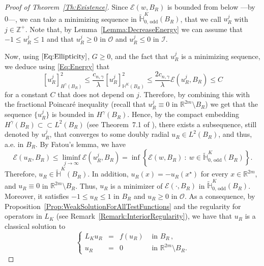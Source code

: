 \documentclass[12pt,reqno]{amsart}
\theoremstyle{definition}
\theoremstyle{remark}
\newcommand{\con}[1]{\mathbb{#1}}
\newcommand{\R}{\con{R}} %
\newcommand{\Z}{\con{Z}} %
\renewcommand{\H}{\con{H}}
\newcommand{\ecal}{\mathcal{E}}
\newcommand{\ical}{\mathcal{I}}
\newcommand{\ocal}{\mathcal{O}}
\newcommand{\s}{\gamma}
\newcommand{\setcond}[2]{\left \{ #1 \ : \ #2  \right \}}
\newcommand\beqc[1]{\left\{\begin{array}{#1}}
\newcommand\eeqc{\end{array} \right.}
\def\PDEsystem{rcll}
\numberwithin{equation}{section}
\begin{document}
\begin{proof}[Proof of Theorem~\ref{Th:Existence}]
	Since $\ecal(w,B_R)$ is bounded from below ---by $0$---, we can take a minimizing sequence in $\widetilde{\H}^K_{0, \,\mathrm{odd}}(B_R)$, that we call $u_R^j$ with $j\in \Z^+$. Note that, by Lemma~\ref{Lemma:DecreaseEnergy} we can assume that $-1 \leq u_R^j \leq 1$ and that $u_R^j \geq 0$ in $\ocal$ and  $u_R^j \leq 0$ in $\ical$. 
	
	Now, using $\eqref{Eq:Ellipticity}$, $G\geq 0$, and the fact that $u_R^j$ is a minimizing sequence, we deduce using \eqref{Eq:Energy} that 
	$$
	[u_R^j]^2_{H^\s(B_R)} \leq \dfrac{c_{n,\s}}{\lambda}  [u_R^j]^2_{\H^K(B_R)}\leq \dfrac{2 c_{n,\s}}{\lambda}\ecal(u_R^j,B_R) \leq C
	$$
	for a constant $C$ that does not depend on $j$. Therefore, by combining this with the fractional Poincaré inequality (recall that $u_R^j \equiv 0$ in $\R^{2m}\setminus B_R$) we get that the sequence $\{u_R^j\}$ is bounded in $H^\s(B_R)$. Hence, by the compact embedding $H^\s(B_R) \subset \subset L^2(B_R)$ (see Theorem~7.1 of \cite{HitchhikerGuide}), there exists a subsequence, still denoted by $u_R^j$,  that converges to some doubly radial $u_R \in L^2(B_R)$, and thus, a.e. in $B_R$. By Fatou's lemma, we have
	$$
	\ecal(u_R, B_R)
	\leq \liminf_{j\to \infty} \ecal(u_R^j, B_R) = \inf \setcond{\ecal(w, B_R)}{w \in \widetilde{\H}^K_{0, \,\mathrm{odd}}(B_R)}.
	$$
	Therefore, $u_R \in \widetilde{\H}^K(B_R)$. In addition, $u_R(x) = - u_R(x^\star)$ for every $x\in \R^{2m}$, and $u_R \equiv 0 $ in $\R^{2m} \setminus B_R$. Thus, $u_R$ is a minimizer of $\ecal(\cdot, B_R)$ in $\widetilde{\H}^K_{0, \,\mathrm{odd}}(B_R)$. Moreover, it satisfies $-1\leq u_R \leq 1$ in $B_R$ and $u_R\geq 0$ in $\ocal$. As a consequence, by Proposition~\ref{Prop:WeakSolutionForAllTestFunctions} and the regularity for operators in $L_K$ (see Remark~\ref{Remark:InteriorRegularity}), we have that $u_R$ is a classical solution to
	$$
	 \beqc{\PDEsystem}
	 L_K  u_R &=& f(u_R) & \textrm{ in } B_R\,,\\
	 u_R &=& 0 & \textrm{ in }\R^{2m} \setminus B_R.
	 \eeqc
	$$	
	

\end{proof}
\end{document}
